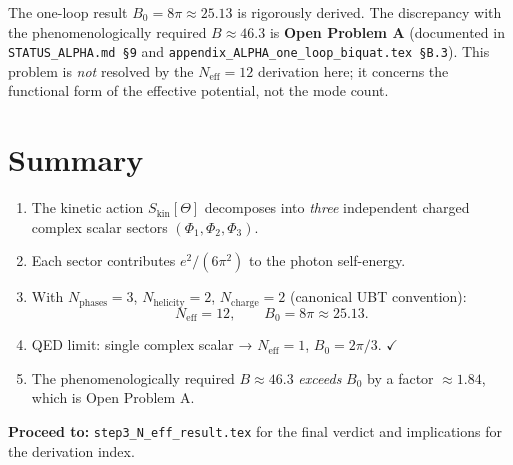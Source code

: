 \documentclass[12pt,a4paper]{article}
\theoremstyle{definition}
\theoremstyle{remark}
\newcommand{\Neff}{N_{\mathrm{eff}}}
\begin{document}
The one-loop result $B_0 = 8\pi \approx 25.13$ is rigorously derived.
The discrepancy with the phenomenologically required $B \approx 46.3$ is
\textbf{Open Problem A} (documented in \texttt{STATUS\_ALPHA.md §9} and
\texttt{appendix\_ALPHA\_one\_loop\_biquat.tex §B.3}).  This problem is
\emph{not} resolved by the $\Neff = 12$ derivation here; it concerns the
functional form of the effective potential, not the mode count.

\section{Summary}
\label{sec:summary}

\begin{enumerate}
  \item The kinetic action $S_\mathrm{kin}[\Theta]$ decomposes into
    \emph{three} independent charged complex scalar sectors
    $(\Phi_1, \Phi_2, \Phi_3)$.
  \item Each sector contributes $e^2/(6\pi^2)$ to the photon self-energy.
  \item With $N_\mathrm{phases} = 3$, $N_\mathrm{helicity} = 2$,
    $N_\mathrm{charge} = 2$ (canonical UBT convention):
    \begin{equation}
      \Neff = 12, \qquad B_0 = 8\pi \approx 25.13.
    \end{equation}
  \item QED limit: single complex scalar → $\Neff = 1$, $B_0 = 2\pi/3$. $\checkmark$
  \item The phenomenologically required $B \approx 46.3$ \emph{exceeds} $B_0$
    by a factor $\approx 1.84$, which is Open Problem A.
\end{enumerate}

\noindent\textbf{Proceed to:}
\texttt{step3\_N\_eff\_result.tex} for the final verdict
and implications for the derivation index.
\end{document}

